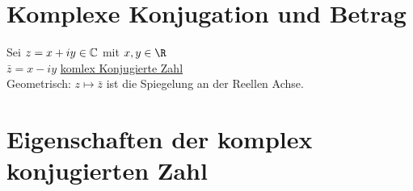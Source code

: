 \section{Komplexe Konjugation und Betrag}
Sei $z = x + iy \in \text{$\mathbb{C}$}$ mit $x, y \in \R$\\
$\bar{z} = x - iy$ \ul{komlex Konjugierte Zahl}\\
Geometrisch: $z \mapsto \bar{z}$ ist die Spiegelung an der Reellen Achse.
\section{Eigenschaften der komplex konjugierten Zahl}
